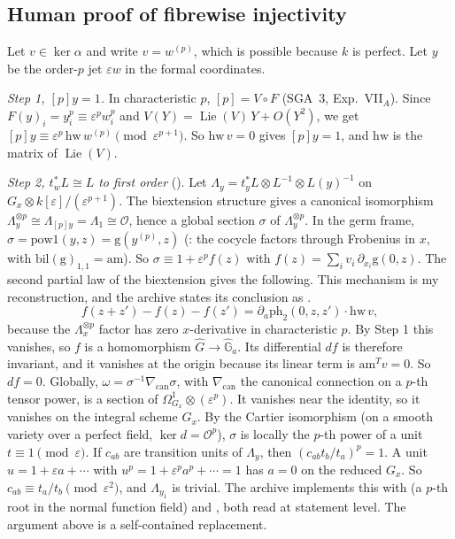 \documentclass[11pt]{article}
\theoremstyle{remark}
\begin{document}
\subsection{Human proof of fibrewise injectivity}

Let $v\in\ker\alpha$ and write $v=w^{(p)}$, which is possible because $k$ is perfect. Let $y$ be the order-$p$ jet $\varepsilon w$ in the formal coordinates.

\noindent\emph{Step 1, $[p]y=1$.} In characteristic $p$, $[p]=V\circ F$ (SGA~3, Exp.~VII$_A$). Since $F(y)_i=y_i^p\equiv\varepsilon^pw_i^p$ and $V(Y)=\operatorname{Lie}(V)\,Y+O(Y^2)$, we get $[p]y\equiv\varepsilon^p\,\mathrm{hw}\,w^{(p)}\pmod{\varepsilon^{p+1}}$. So $\mathrm{hw}\,v=0$ gives $[p]y=1$, and $\mathrm{hw}$ is the matrix of $\operatorname{Lie}(V)$.

\noindent\emph{Step 2, $t_w^*L\cong L$ to first order} (). Let $\Lambda_y=t_y^*L\otimes L^{-1}\otimes L(y)^{-1}$ on $G_x\otimes k[\varepsilon]/(\varepsilon^{p+1})$. The biextension structure gives a canonical isomorphism $\Lambda_y^{\otimes p}\cong\Lambda_{[p]y}=\Lambda_1\cong\mathcal O$, hence a global section $\sigma$ of $\Lambda_y^{\otimes p}$. In the germ frame, $\sigma=\mathrm{pow1}(y,z)=\mathrm{g}(y^{(p)},z)$ (: the cocycle factors through Frobenius in $x$, with $\mathrm{bil}(\mathrm{g})_{1,1}=\mathrm{am}$). So $\sigma\equiv1+\varepsilon^pf(z)$ with $f(z)=\sum_iv_i\,\partial_{x_i}\mathrm{g}(0,z)$. The second partial law of the biextension gives the following. This mechanism is my reconstruction, and the archive states its conclusion as .
\[
f(z+z')-f(z)-f(z')=\partial_a\mathrm{ph}_2(0,z,z')\cdot\mathrm{hw}\,v ,
\]
because the $\Lambda_x^{\otimes p}$ factor has zero $x$-derivative in characteristic $p$. By Step 1 this vanishes, so $f$ is a homomorphism $\hat G\to\hat{\mathbb G}_a$. Its differential $df$ is therefore invariant, and it vanishes at the origin because its linear term is $\mathrm{am}^{T}v=0$. So $df=0$. Globally, $\omega=\sigma^{-1}\nabla_{\mathrm{can}}\sigma$, with $\nabla_{\mathrm{can}}$ the canonical connection on a $p$-th tensor power, is a section of $\Omega^1_{G_x}\otimes(\varepsilon^p)$. It vanishes near the identity, so it vanishes on the integral scheme $G_x$. By the Cartier isomorphism (on a smooth variety over a perfect field, $\ker d=\mathcal O^p$), $\sigma$ is locally the $p$-th power of a unit $t\equiv1\pmod\varepsilon$. If $c_{ab}$ are transition units of $\Lambda_y$, then $(c_{ab}t_b/t_a)^p=1$. A unit $u=1+\varepsilon a+\cdots$ with $u^p=1+\varepsilon^pa^p+\cdots=1$ has $a=0$ on the reduced $G_x$. So $c_{ab}\equiv t_a/t_b\pmod{\varepsilon^2}$, and $\Lambda_{y_1}$ is trivial. The archive implements this with  (a $p$-th root in the normal function field) and , both read at statement level. The argument above is a self-contained replacement.
\end{document}
